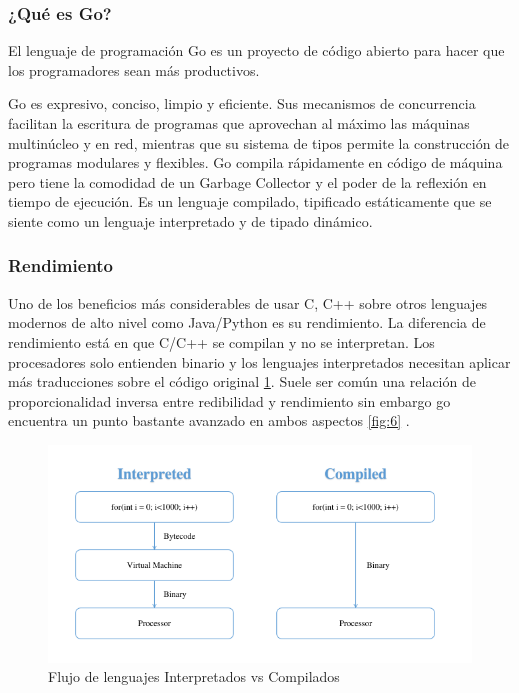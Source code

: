 \subsubsection{¿Qué es Go?}
El lenguaje de programación Go es un proyecto de código abierto para hacer que los programadores sean más productivos.

Go es expresivo, conciso, limpio y eficiente. Sus mecanismos de concurrencia facilitan la escritura de programas que aprovechan al máximo las máquinas multinúcleo y en red, mientras que su sistema de tipos permite la construcción de programas modulares y flexibles. Go compila rápidamente en código de máquina pero tiene la comodidad de un Garbage Collector y el poder de la reflexión en tiempo de ejecución. Es un lenguaje compilado, tipificado estáticamente que se siente como un lenguaje interpretado y de tipado dinámico.

\subsubsection{Rendimiento}
Uno de los beneficios más considerables de usar C, C++ sobre otros lenguajes modernos de alto nivel como Java/Python es su rendimiento. La diferencia de rendimiento está en que C/C++ se compilan y no se interpretan. Los procesadores solo entienden binario y los lenguajes interpretados necesitan aplicar más traducciones sobre el código original \ref{fig:5}. Suele ser común una relación de proporcionalidad inversa entre redibilidad y rendimiento sin embargo go encuentra un punto bastante avanzado en ambos aspectos \ref{fig:6} .

\begin{figure}[h]
	\includegraphics[width=\linewidth]{Graphics/compiled_go.png}
	\caption{Flujo de lenguajes Interpretados vs Compilados}
	\label{fig:5}
\end{figure} 

